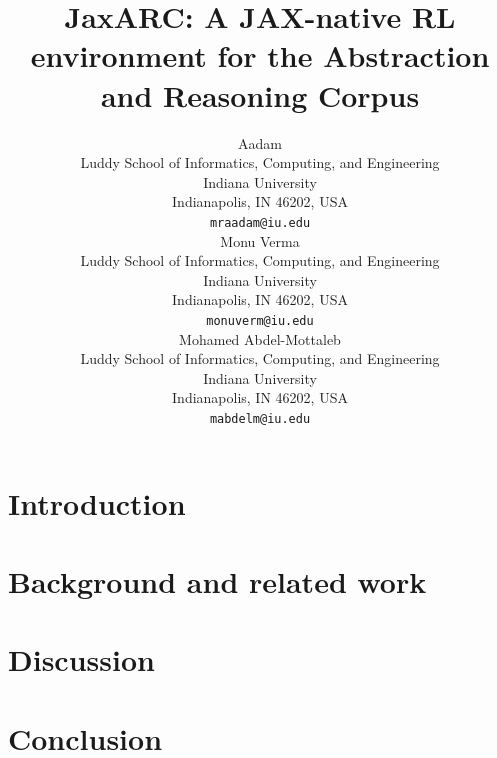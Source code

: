 \documentclass{article}
\title{JaxARC: A JAX-native RL environment for the Abstraction and Reasoning Corpus}
\author{%
  Aadam\\
  Luddy School of Informatics, Computing, and Engineering\\
  Indiana University\\
  Indianapolis, IN 46202, USA\\
  \texttt{mraadam@iu.edu}\\
  \And
  Monu Verma\\
  Luddy School of Informatics, Computing, and Engineering\\
  Indiana University\\
  Indianapolis, IN 46202, USA\\
  \texttt{monuverm@iu.edu}\\
  \And
  Mohamed Abdel-Mottaleb\\
  Luddy School of Informatics, Computing, and Engineering\\
  Indiana University\\
  Indianapolis, IN 46202, USA\\
  \texttt{mabdelm@iu.edu}\\
}
\begin{document}
\maketitle

\begin{abstract}

\end{abstract}

\section{Introduction}


\section{Background and related work}






\section{Discussion}


\section{Conclusion}





\newpage
\appendix


\newpage

\end{document}
